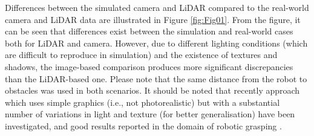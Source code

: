Differences between the simulated camera and LiDAR compared to the real-world camera and LiDAR data are illustrated in Figure \ref{fig:Fig01}. From the figure, it can be seen that differences exist between the simulation and real-world cases both for LiDAR and camera. However, due to different lighting conditions (which are difficult to reproduce in simulation) and the existence of textures and shadows, the image-based comparison produces more significant discrepancies than the LiDAR-based one. Please note that the same distance from the robot to obstacles was used in both scenarios. It should be noted that recently approach which uses simple graphics (i.e., not photorealistic) but with a substantial number of variations in light and texture (for better generalisation) have been investigated, and good results reported in the domain of robotic grasping \cite{Bousmalis2018}.

